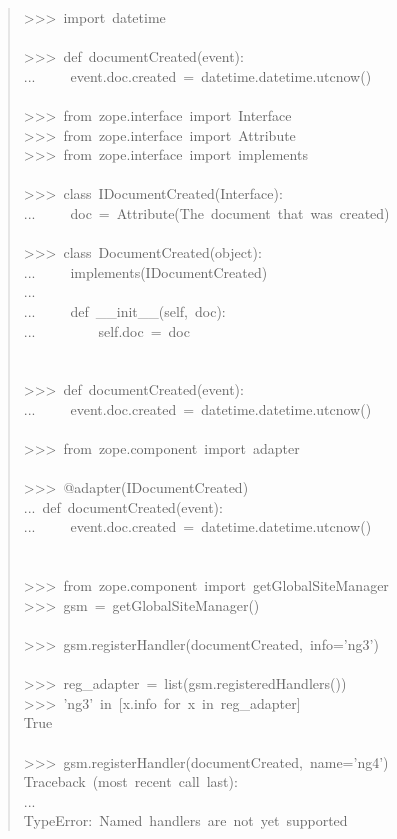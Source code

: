 \documentclass[14pt,a4paper,openany,twoside,final]{extbook}
\begin{document}
\begin{quote}{\ttfamily \raggedright \noindent
>{}>{}>~import~datetime\\
~\\
>{}>{}>~def~documentCreated(event):\\
...~~~~~event.doc.created~=~datetime.datetime.utcnow()\\
~\\
>{}>{}>~from~zope.interface~import~Interface\\
>{}>{}>~from~zope.interface~import~Attribute\\
>{}>{}>~from~zope.interface~import~implements\\
~\\
>{}>{}>~class~IDocumentCreated(Interface):\\
...~~~~~doc~=~Attribute(\textquotedbl{}The~document~that~was~created\textquotedbl{})\\
~\\
>{}>{}>~class~DocumentCreated(object):\\
...~~~~~implements(IDocumentCreated)\\
...\\
...~~~~~def~\_\_init\_\_(self,~doc):\\
...~~~~~~~~~self.doc~=~doc\\
~\\
~\\
>{}>{}>~def~documentCreated(event):\\
...~~~~~event.doc.created~=~datetime.datetime.utcnow()\\
~\\
>{}>{}>~from~zope.component~import~adapter\\
~\\
>{}>{}>~@adapter(IDocumentCreated)\\
...~def~documentCreated(event):\\
...~~~~~event.doc.created~=~datetime.datetime.utcnow()\\
~\\
~\\
>{}>{}>~from~zope.component~import~getGlobalSiteManager\\
>{}>{}>~gsm~=~getGlobalSiteManager()\\
~\\
>{}>{}>~gsm.registerHandler(documentCreated,~info='ng3')\\
~\\
>{}>{}>~reg\_adapter~=~list(gsm.registeredHandlers())\\
>{}>{}>~'ng3'~in~{[}x.info~for~x~in~reg\_adapter{]}\\
True\\
~\\
>{}>{}>~gsm.registerHandler(documentCreated,~name='ng4')\\
Traceback~(most~recent~call~last):\\
...\\
TypeError:~Named~handlers~are~not~yet~supported
}
\end{quote}
\end{document}
